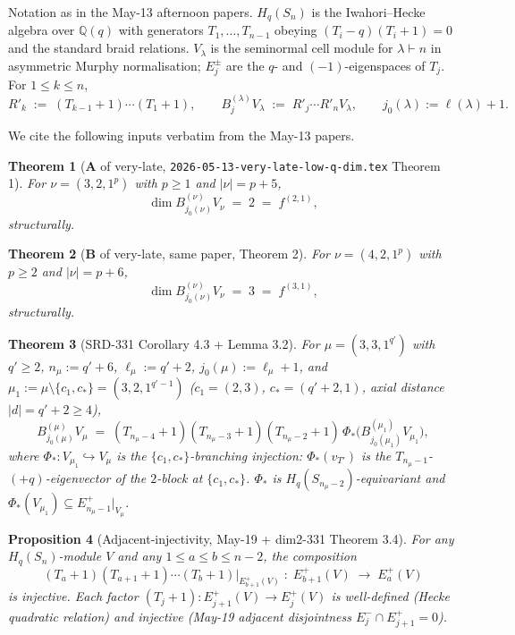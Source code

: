 \documentclass[11pt]{article}
\newtheorem{theorem}{Theorem}
\newtheorem{proposition}[theorem]{Proposition}
\theoremstyle{definition}
\begin{document}
Notation as in the May-13 afternoon papers. $H_q(S_n)$ is the
Iwahori--Hecke algebra over $\mathbb{Q}(q)$ with generators
$T_1, \ldots, T_{n-1}$ obeying $(T_i - q)(T_i + 1) = 0$ and the
standard braid relations. $V_\lambda$ is the seminormal cell module
for $\lambda \vdash n$ in asymmetric Murphy normalisation; $E_j^\pm$
are the $q$- and $(-1)$-eigenspaces of $T_j$. For $1 \le k \le n$,
\[
   R'_k \;:=\; (T_{k-1}{+}1)\cdots(T_1{+}1),
   \qquad
   B^{(\lambda)}_j V_\lambda \;:=\; R'_j\cdots R'_n V_\lambda,
   \qquad
   j_0(\lambda) := \ell(\lambda) + 1.
\]

We cite the following inputs verbatim from the May-13 papers.

\begin{theorem}[\textbf{A} of very-late, \texttt{2026-05-13-very-late-low-q-dim.tex} Theorem 1]\label{thm:A}
For $\nu = (3, 2, 1^p)$ with $p \ge 1$ and $|\nu| = p + 5$,
\[
   \dim B^{(\nu)}_{j_0(\nu)} V_\nu \;=\; 2 \;=\; f^{(2, 1)},
\]
\emph{structurally}.
\end{theorem}

\begin{theorem}[\textbf{B} of very-late, same paper, Theorem 2]\label{thm:B}
For $\nu = (4, 2, 1^p)$ with $p \ge 2$ and $|\nu| = p + 6$,
\[
   \dim B^{(\nu)}_{j_0(\nu)} V_\nu \;=\; 3 \;=\; f^{(3, 1)},
\]
\emph{structurally}.
\end{theorem}

\begin{theorem}[SRD-331 Corollary 4.3 + Lemma 3.2]\label{thm:srd331-reduction}
For $\mu = (3, 3, 1^{q'})$ with $q' \ge 2$, $n_\mu := q' + 6$,
$\ell_\mu := q' + 2$, $j_0(\mu) := \ell_\mu + 1$, and
$\mu_1 := \mu \setminus \{c_1, c_*\} = (3, 2, 1^{q'-1})$
($c_1 = (2, 3)$, $c_* = (q'+2, 1)$, axial distance
$|d| = q' + 2 \ge 4$),
\begin{equation}\label{eq:srd331-reduction}
   B^{(\mu)}_{j_0(\mu)} V_\mu
   \;=\;
   (T_{n_\mu-4}{+}1)(T_{n_\mu-3}{+}1)(T_{n_\mu-2}{+}1)\,
   \Phi_*\!\big(B^{(\mu_1)}_{j_0(\mu_1)} V_{\mu_1}\big),
\end{equation}
where $\Phi_* : V_{\mu_1} \hookrightarrow V_\mu$ is the
$\{c_1, c_*\}$-branching injection: $\Phi_*(v_{T'})$ is the
$T_{n_\mu - 1}$-$(+q)$-eigenvector of the $2$-block at
$\{c_1, c_*\}$. $\Phi_*$ is $H_q(S_{n_\mu - 2})$-equivariant and
$\Phi_*(V_{\mu_1}) \subseteq E_{n_\mu - 1}^+|_{V_\mu}$.
\end{theorem}

\begin{proposition}[Adjacent-injectivity, May-19 + dim2-331 Theorem 3.4]\label{prop:adj-inj}
For any $H_q(S_n)$-module $V$ and any $1 \le a \le b \le n - 2$, the
composition
\[
   (T_a{+}1)(T_{a+1}{+}1)\cdots(T_b{+}1)\big|_{E_{b+1}^+(V)}
   \;:\;
   E_{b+1}^+(V) \;\longrightarrow\; E_a^+(V)
\]
is injective. Each factor $(T_j{+}1) : E_{j+1}^+(V) \to E_j^+(V)$ is
well-defined (Hecke quadratic relation) and injective (May-19
adjacent disjointness $E_j^- \cap E_{j+1}^+ = 0$).
\end{proposition}
\end{document}

